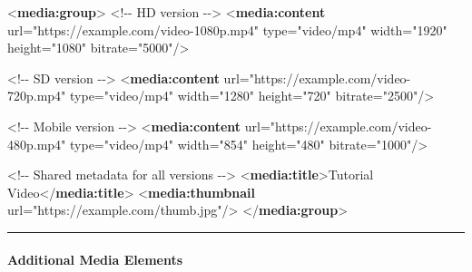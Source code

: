 \documentclass[
  letterpaper,
  DIV=11,
  numbers=noendperiod]{scrartcl}
\makeatletter
\let\oldparagraph\paragraph
\renewcommand{\paragraph}{
    \@ifstar
      \xxxParagraphStar
      \xxxParagraphNoStar
  }
\newcommand{\xxxParagraphStar}[1]{\oldparagraph*{#1}\mbox{}}
\newcommand{\xxxParagraphNoStar}[1]{\oldparagraph{#1}\mbox{}}
\newenvironment{Shaded}{\begin{snugshade}}{\end{snugshade}}
\newcommand{\CommentTok}[1]{\textcolor[rgb]{0.37,0.37,0.37}{#1}}
\newcommand{\KeywordTok}[1]{\textcolor[rgb]{0.00,0.23,0.31}{\textbf{#1}}}
\newcommand{\NormalTok}[1]{\textcolor[rgb]{0.00,0.23,0.31}{#1}}
\newcommand{\OtherTok}[1]{\textcolor[rgb]{0.00,0.23,0.31}{#1}}
\newcommand{\StringTok}[1]{\textcolor[rgb]{0.13,0.47,0.30}{#1}}
\makeatother
\begin{document}
\begin{Shaded}
\begin{Highlighting}[]
\NormalTok{\textless{}}\KeywordTok{media:group}\NormalTok{\textgreater{}}
  \CommentTok{\textless{}!{-}{-} HD version {-}{-}\textgreater{}}
\NormalTok{  \textless{}}\KeywordTok{media:content} 
\OtherTok{      url=}\StringTok{"https://example.com/video{-}1080p.mp4"}
\OtherTok{      type=}\StringTok{"video/mp4"}
\OtherTok{      width=}\StringTok{"1920"}
\OtherTok{      height=}\StringTok{"1080"}
\OtherTok{    bitrate=}\StringTok{"5000"}\NormalTok{/\textgreater{}}
  
\CommentTok{\textless{}!{-}{-} SD version {-}{-}\textgreater{}}
\NormalTok{  \textless{}}\KeywordTok{media:content} 
\OtherTok{      url=}\StringTok{"https://example.com/video{-}720p.mp4"}
\OtherTok{      type=}\StringTok{"video/mp4"}
\OtherTok{      width=}\StringTok{"1280"}
\OtherTok{      height=}\StringTok{"720"}
\OtherTok{      bitrate=}\StringTok{"2500"}\NormalTok{/\textgreater{}}
  
  \CommentTok{\textless{}!{-}{-} Mobile version {-}{-}\textgreater{}}
\NormalTok{  \textless{}}\KeywordTok{media:content} 
\OtherTok{      url=}\StringTok{"https://example.com/video{-}480p.mp4"}
\OtherTok{type=}\StringTok{"video/mp4"}
\OtherTok{      width=}\StringTok{"854"}
\OtherTok{      height=}\StringTok{"480"}
\OtherTok{      bitrate=}\StringTok{"1000"}\NormalTok{/\textgreater{}}
  
  \CommentTok{\textless{}!{-}{-} Shared metadata for all versions {-}{-}\textgreater{}}
\NormalTok{  \textless{}}\KeywordTok{media:title}\NormalTok{\textgreater{}Tutorial Video\textless{}/}\KeywordTok{media:title}\NormalTok{\textgreater{}}
\NormalTok{  \textless{}}\KeywordTok{media:thumbnail}\OtherTok{ url=}\StringTok{"https://example.com/thumb.jpg"}\NormalTok{/\textgreater{}}
\NormalTok{\textless{}/}\KeywordTok{media:group}\NormalTok{\textgreater{}}
\end{Highlighting}
\end{Shaded}

\begin{center}\rule{0.5\linewidth}{0.5pt}\end{center}

\paragraph{\texorpdfstring{\textbf{Additional Media
Elements}}{Additional Media Elements}}\label{additional-media-elements}
\end{document}
